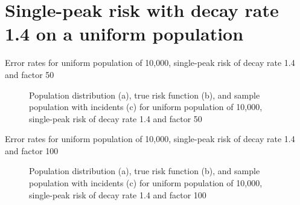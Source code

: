  
\section{Single-peak risk with decay rate 1.4 on a uniform population}
\label{sec:app:results_unif_1.4_1h}

\graphicspath{{./results/unif_50_1.4_1h/}}
\makeatletter
{}
\makeatother

\begin{table}[H]
    
    \caption[]{Error rates for uniform population of 10,000, single-peak risk of decay rate 1.4 and factor 50}
    \label{tab:mean_error_rates:unif_50_1.4_1h}
\end{table}

\begin{figure}[H]
    
    \caption[]{Population distribution (a), true risk function (b), and sample population with incidents (c) for uniform population of 10,000, single-peak risk of decay rate 1.4 and factor 50}
    \label{fig:distributions:unif_50_1.4_1h}    
\end{figure}


\graphicspath{{./results/unif_100_1.4_1h/}}
\makeatletter
{}
\makeatother

\begin{table}[H]

\caption[]{Error rates for uniform population of 10,000, single-peak risk of decay rate 1.4 and factor 100}
\label{tab:mean_error_rates:unif_100_1.4_1h}
\end{table}

\begin{figure}[H]
    
    \caption[]{Population distribution (a), true risk function (b), and sample population with incidents (c) for uniform population of 10,000, single-peak risk of decay rate 1.4 and factor 100}
    \label{fig:distributions:unif_100_1.4_1h}    
\end{figure}


\graphicspath{{./results/unif_200_1.4_1h/}}
\makeatletter
{}
\makeatother

